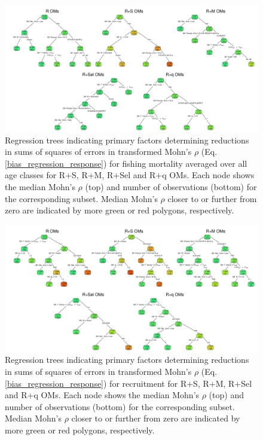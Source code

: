 \documentclass[
  12pt,
]{article}
\begin{document}
\begin{landscape}
\begin{figure}
\begin{center}
\includegraphics[width = 1.4\textwidth]{F_mohns_rho_regtree_plots}
\end{center}
\caption{Regression trees indicating primary factors determining reductions in sums of squares of errors in transformed Mohn's $\rho$ (Eq. \ref{bias_regression_response}) for fishing mortality averaged over all age classes for R+S, R+M, R+Sel and R+q OMs. Each node shows the median Mohn's $\rho$ (top) and number of observations (bottom) for the corresponding subset. Median Mohn's $\rho$ closer to or further from zero are indicated by more green or red polygons, respectively.}\label{F_mohns_rho_regtree}
\end{figure}
\end{landscape}

\begin{landscape}
\begin{figure}
\begin{center}
\includegraphics[width = 1.4\textwidth]{R_mohns_rho_regtree_plots}
\end{center}
\caption{Regression trees indicating primary factors determining reductions in sums of squares of errors in transformed Mohn's $\rho$ (Eq. \ref{bias_regression_response}) for recruitment for R+S, R+M, R+Sel and R+q OMs. Each node shows the median Mohn's $\rho$ (top) and number of observations (bottom) for the corresponding subset. Median Mohn's $\rho$ closer to or further from zero are indicated by more green or red polygons, respectively.}\label{R_mohns_rho_regtree}
\end{figure}
\end{landscape}
\end{document}
